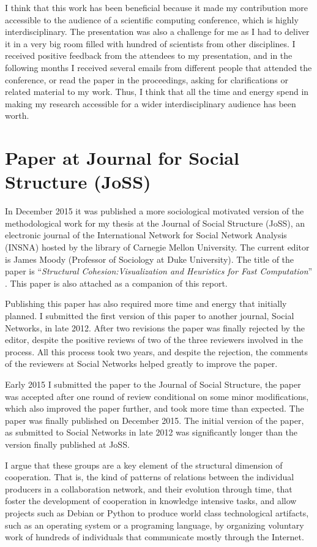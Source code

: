 I think that this work has been beneficial because it made my contribution more accessible to the audience of a scientific computing conference, which is highly interdisciplinary. The presentation was also a challenge for me as I had to deliver it in a very big room filled with hundred of scientists from other disciplines. I received positive feedback from the attendees to my presentation, and in the following months I received several emails from different people that attended the conference, or read the paper in the proceedings, asking for clarifications or related material to my work. Thus, I think that all the time and energy spend in making my research accessible for a wider interdisciplinary audience has been worth.

\section{Paper at Journal for Social Structure (JoSS)}

In December 2015 it was published a more sociological motivated version of the methodological work for my thesis at the Journal of Social Structure (JoSS), an electronic journal of the International Network for Social Network Analysis (INSNA) hosted by the library of Carnegie Mellon University. The current editor is James Moody (Professor of Sociology at Duke University). The title of the paper is ``\textit{Structural Cohesion:Visualization and Heuristics for Fast Computation}'' \citep{torrents:2015}. This paper is also attached as a companion of this report.

Publishing this paper has also required more time and energy that initially planned. I submitted the first version of this paper to another journal, Social Networks, in late 2012. After two revisions the paper was finally rejected by the editor, despite the positive reviews of two of the three reviewers involved in the process. All this process took two years, and despite the rejection, the comments of the reviewers at Social Networks helped greatly to improve the paper.

Early 2015 I submitted the paper to the Journal of Social Structure, the paper was accepted after one round of review conditional on some minor modifications, which also improved the paper further, and took more time than expected. The paper was finally published on December 2015. The initial version of the paper, as submitted to Social Networks in late 2012 was significantly longer than the version finally published at JoSS.

I argue that these groups are a key element of the structural dimension of cooperation. That is, the kind of patterns of relations between the individual producers in a collaboration network, and their evolution through time, that foster the development of cooperation in knowledge intensive tasks, and allow projects such as Debian or Python to produce world class technological artifacts, such as an operating system or a programing language, by organizing voluntary work of hundreds of individuals that communicate mostly through the Internet.
